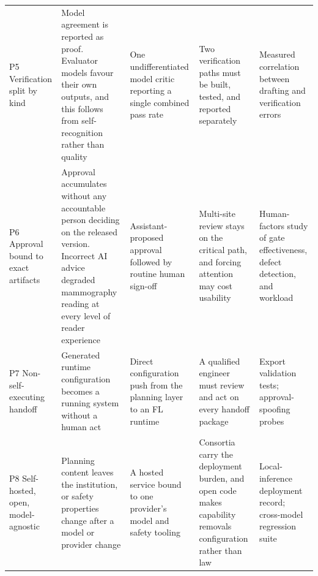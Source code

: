 \begin{table}[!t]
\begin{tabular}{@{}L{2.3cm}L{4.3cm}L{2.9cm}L{3.1cm}L{2.6cm}@{}}
P5 Verification split by kind &
Model agreement is reported as proof. Evaluator models favour their own outputs, and this follows from
self-recognition rather than quality\cite{panickssery2024llm} &
One undifferentiated model critic reporting a single combined pass rate &
Two verification paths must be built, tested, and reported separately &
Measured correlation between drafting and verification errors\\
P6 Approval bound to exact artifacts &
Approval accumulates without any accountable person deciding on the released version. Incorrect AI advice
degraded mammography reading at every level of reader experience\cite{dratsch2023automation} &
Assistant-proposed approval followed by routine human sign-off &
Multi-site review stays on the critical path, and forcing attention may cost usability\cite{buccinca2021trust} &
Human-factors study of gate effectiveness, defect detection, and workload\\
P7 Non-self-executing handoff &
Generated runtime configuration becomes a running system without a human act\cite{ashraf2026medcta} &
Direct configuration push from the planning layer to an FL runtime &
A qualified engineer must review and act on every handoff package &
Export validation tests; approval-spoofing probes\\
P8 Self-hosted, open, model-agnostic &
Planning content leaves the institution, or safety properties change after a model or provider
change\cite{tabassi,autio} &
A hosted service bound to one provider's model and safety tooling &
Consortia carry the deployment burden, and open code makes capability removals configuration rather than law &
Local-inference deployment record; cross-model regression suite\\
\bottomrule
\end{tabular}
\end{table}